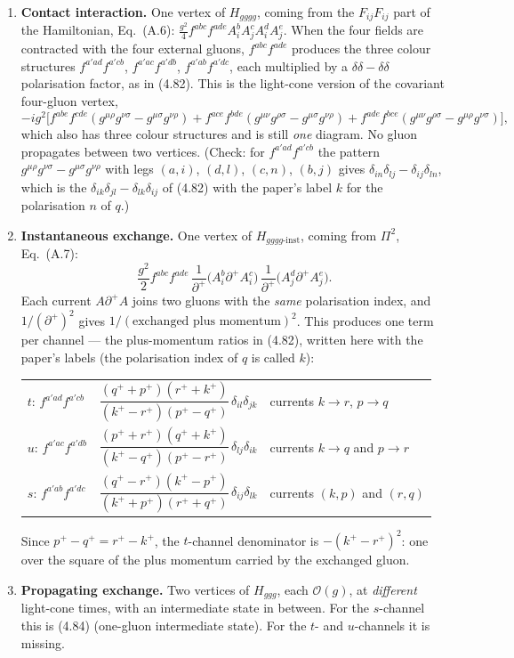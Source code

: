 \begin{enumerate}[label=(\alph*),leftmargin=20pt,itemsep=4pt]
\item \textbf{Contact interaction.} One vertex of $H_{gggg}$, coming from the $F_{ij}F_{ij}$ part of the Hamiltonian, Eq.~(A.6): $\frac{g^2}{4}f^{abc}f^{ade}A^b_iA^c_jA^d_iA^e_j$. When the four fields are contracted with the four external gluons, $f^{abc}f^{ade}$ produces the three colour structures $f^{a'ad}f^{a'cb}$, $f^{a'ac}f^{a'db}$, $f^{a'ab}f^{a'dc}$, each multiplied by a $\delta\delta-\delta\delta$ polarisation factor, as in (4.82). This is the light-cone version of the covariant four-gluon vertex,
\[
-ig^2\big[f^{abe}f^{cde}(g^{\mu\rho}g^{\nu\sigma}-g^{\mu\sigma}g^{\nu\rho})+f^{ace}f^{bde}(g^{\mu\nu}g^{\rho\sigma}-g^{\mu\sigma}g^{\nu\rho})+f^{ade}f^{bce}(g^{\mu\nu}g^{\rho\sigma}-g^{\mu\rho}g^{\nu\sigma})\big],
\]
which also has three colour structures and is still \emph{one} diagram. No gluon propagates between two vertices. (Check: for $f^{a'ad}f^{a'cb}$ the pattern $g^{\mu\rho}g^{\nu\sigma}-g^{\mu\sigma}g^{\nu\rho}$ with legs $(a,i)$, $(d,l)$, $(c,n)$, $(b,j)$ gives $\delta_{in}\delta_{lj}-\delta_{ij}\delta_{ln}$, which is the $\delta_{ik}\delta_{jl}-\delta_{lk}\delta_{ij}$ of (4.82) with the paper's label $k$ for the polarisation $n$ of $q$.)
\item \textbf{Instantaneous exchange.} One vertex of $H_{gggg\text{-inst}}$, coming from $\Pi^2$, Eq.~(A.7):
\[
\frac{g^2}{2}f^{abc}f^{ade}\,\frac{1}{\partial^+}\big(A^b_i\partial^+A^c_i\big)\,\frac{1}{\partial^+}\big(A^d_j\partial^+A^e_j\big).
\]
Each current $A\partial^+A$ joins two gluons with the \emph{same} polarisation index, and $1/(\partial^+)^2$ gives $1/(\text{exchanged plus momentum})^2$. This produces one term per channel --- the plus-momentum ratios in (4.82), written here with the paper's labels (the polarisation index of $q$ is called $k$):
\begin{center}
\small
\begin{tabular}{llp{4.2cm}}
$t$: $f^{a'ad}f^{a'cb}$ & $\dfrac{(q^++p^+)(r^++k^+)}{(k^+-r^+)(p^+-q^+)}\,\delta_{il}\delta_{jk}$ & currents $k\!\to\! r$, $p\!\to\! q$\\[10pt]
$u$: $f^{a'ac}f^{a'db}$ & $\dfrac{(p^++r^+)(q^++k^+)}{(k^+-q^+)(p^+-r^+)}\,\delta_{lj}\delta_{ik}$ & currents $k\!\to\! q$ and $p\!\to\! r$\\[10pt]
$s$: $f^{a'ab}f^{a'dc}$ & $\dfrac{(q^+-r^+)(k^+-p^+)}{(k^++p^+)(r^++q^+)}\,\delta_{ij}\delta_{lk}$ & currents $(k,p)$ and $(r,q)$
\end{tabular}
\end{center}
Since $p^+-q^+=r^+-k^+$, the $t$-channel denominator is $-(k^+-r^+)^2$: one over the square of the plus momentum carried by the exchanged gluon.
\item \textbf{Propagating exchange.} Two vertices of $H_{ggg}$, each $\mathcal O(g)$, at \emph{different} light-cone times, with an intermediate state in between. For the $s$-channel this is (4.84) (one-gluon intermediate state). For the $t$- and $u$-channels it is missing.
\end{enumerate}
